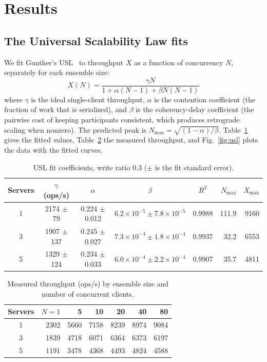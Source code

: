 \documentclass{llncs}
\begin{document}
\section{Results}
\label{sec:results}

\subsection{The Universal Scalability Law fits}

We fit Gunther's USL~\cite{gunther_usl_dsconf} to throughput $X$ as a
function of concurrency $N$, separately for each ensemble size:
\begin{equation}
  X(N) = \frac{\gamma N}{1 + \alpha (N - 1) + \beta N (N - 1)}
  \label{eq:usl}
\end{equation}
where $\gamma$ is the ideal single-client throughput, $\alpha$ is the
contention coefficient (the fraction of work that is serialized), and $\beta$
is the coherency-delay coefficient (the pairwise cost of keeping
participants consistent, which produces retrograde scaling when nonzero).
The predicted peak is $N_{\max}=\sqrt{(1-\alpha)/\beta}$. Table~\ref{tab:usl}
gives the fitted values, Table~\ref{tab:raw} the measured throughput, and
Fig.~\ref{fig:usl} plots the data with the fitted curves.

\begin{table}[h]
  \centering
  \caption{USL fit coefficients, write ratio 0.3 ($\pm$ is the fit
    standard error).}
  \label{tab:usl}
  \setlength{\tabcolsep}{4pt}
  \begin{tabular}{@{}cccccrr@{}}
    \toprule
    Servers & $\gamma$ (ops/s) & $\alpha$ & $\beta$ & $R^2$ & $N_{\max}$ & $X_{\max}$ \\
    \midrule
    1 & 2174 $\pm$ 79  & 0.224 $\pm$ 0.012 & $6.2\times10^{-5}\pm7.8\times10^{-5}$ & 0.9988 & 111.9 & 9160 \\
    3 & 1907 $\pm$ 137 & 0.245 $\pm$ 0.027 & $7.3\times10^{-4}\pm1.8\times10^{-4}$ & 0.9937 & 32.2  & 6553 \\
    5 & 1329 $\pm$ 124 & 0.234 $\pm$ 0.033 & $6.0\times10^{-4}\pm2.2\times10^{-4}$ & 0.9907 & 35.7  & 4811 \\
    \bottomrule
  \end{tabular}
\end{table}

\begin{table}[h]
  \centering
  \caption{Measured throughput (ops/s) by ensemble size and number of
    concurrent clients.}
  \label{tab:raw}
  \begin{tabular}{@{}crrrrrr@{}}
    \toprule
    Servers & $N{=}1$ & 5 & 10 & 20 & 40 & 80 \\
    \midrule
    1 & 2302 & 5660 & 7158 & 8239 & 8974 & 9084 \\
    3 & 1839 & 4718 & 6071 & 6364 & 6373 & 6197 \\
    5 & 1191 & 3478 & 4368 & 4493 & 4824 & 4588 \\
    \bottomrule
  \end{tabular}
\end{table}
\end{document}
